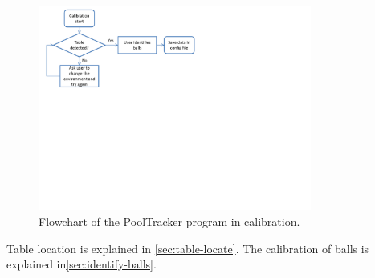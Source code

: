 \begin{figure}[H]
\begin{center}
\leavevmode
\includegraphics[width=0.8\textwidth]{images/calib_flowchart}
\end{center}
\caption{Flowchart of the PoolTracker program in calibration.}
\label{fig:calib_flowchart}
\end{figure}

Table location is explained in \ref{sec:table-locate}. The calibration of balls is explained in\ref{sec:identify-balls}.


